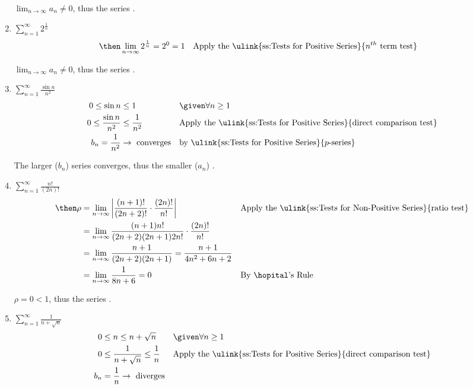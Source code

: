 \begin{enumerate}[itemsep=12em]
    \(\lim_{n \to \infty} a_n \neq 0\), thus the series .

  \vspace{-32pt}
  \item \(\displaystyle \sum_{n=1}^{\infty} 2^\frac{1}{n} \)
    \begin{align*}
      &\then \lim_{n \to \infty} 2^{\frac{1}{n}} = 2^0 = 1
      && \text{Apply the \ulink{ss:Tests for Positive Series}{\(n^{th} \) term test}}
    \end{align*}

    \(\lim_{n \to \infty} a_n \neq 0\), thus the series .

  \vspace{-16pt}
  \item \(\displaystyle \sum_{n=1}^{\infty} \frac{\sin n}{n^2} \)
    \begin{align*}
      0 \leq \sin  n &\leq 1 && \given \forall n \geq 1 \\
      0 \leq \frac{\sin n}{n^2} &\leq \frac{1}{n^2}
      && \text{Apply the \ulink{ss:Tests for Positive Series}{direct comparison test}} \\
      b_n = \frac{1}{n^2} &\to ~\text{converges}
      && \text{by \ulink{ss:Tests for Positive Series}{\(p\)-series}}
    \end{align*}

    The larger (\(b_n\)) series converges, thus the smaller (\(a_n\)) .

  \vspace{-16pt}
  \item \(\displaystyle \sum_{n=1}^{\infty} \frac{n!}{(2n)!} \)
    \begin{align*}
      \then \rho &= \lim_{n \to \infty} \left|
     \frac{(n+1)!}{(2n+2)!} \cdot \frac{(2n)!}{n!} \right|
     && \text{Apply the \ulink{ss:Tests for Non-Positive Series}{ratio test}} \\
     &=\lim_{n \to \infty}
     \frac{(n+1)n!}{(2n+2)(2n+1)2n!} \cdot \frac{(2n)!}{n!} \\
     &=\lim_{n \to \infty}
     \frac{n+1}{(2n+2)(2n+1)} =
     \frac{n+1}{4n^2+6n+2} \\
     &=\lim_{n \to \infty} \frac{1}{8n + 6} = 0
     && \text{By \hopital's Rule} \\
    \end{align*}

  \(\rho = 0 < 1\), thus the series .

  \vspace{-16pt}
  \item \(\displaystyle \sum_{n=1}^{\infty} \frac{1}{n + \sqrt{n} } \)
    \begin{align*}
      0 &\leq n \leq n +\sqrt{n}  && \given \forall n \geq 1 \\
      0 &\leq \frac{1}{n+\sqrt{n} } \leq \frac{1}{n}
      && \text{Apply the \ulink{ss:Tests for Positive Series}{direct comparison test}} \\
      b_n &= \frac{1}{n} \to ~\text{diverges}
    \end{align*}


\end{enumerate}
